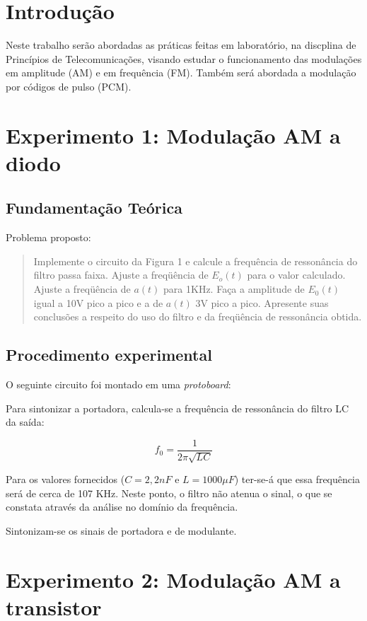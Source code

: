 \documentclass[]{report}
\title{}
\author{Renan Birck Pinheiro}
\begin{document}

\tableofcontents

\chapter{Introdução}
Neste trabalho serão abordadas as práticas feitas em laboratório, na discplina de Princípios de Telecomunicações, visando estudar o funcionamento das modulações em amplitude (AM) e em frequência (FM). Também será abordada a modulação por códigos de pulso (PCM). 

\chapter{Experimento 1: Modulação AM a diodo}
\section{Fundamentação Teórica}


Problema proposto:
\begin{quote}
Implemente o circuito da Figura 1 e calcule a frequência de ressonância do filtro passa faixa. Ajuste a freqüência de $E_o(t)$ para o valor calculado. Ajuste a freqüência de $a(t)$ para 1KHz. Faça a amplitude de $E_0(t)$ igual a 10V pico a pico e a de $a(t)$ 3V pico a pico. Apresente suas conclusões a respeito do uso do filtro e da freqüência de ressonância obtida.
\end{quote}

\section{Procedimento experimental}
O seguinte circuito foi montado em uma \textit{protoboard}:

Para sintonizar a portadora, calcula-se a frequência de ressonância do filtro LC da saída:

\begin{equation}
f_0 = \frac{1}{2 \pi \sqrt{LC}}
\end{equation}

Para os valores fornecidos ($C = 2,2 nF$ e $L = 1000 \mu F$) ter-se-á que essa frequência será de cerca de 107 KHz. Neste ponto, o filtro não atenua o sinal, o que se constata através da análise no domínio da frequência.

Sintonizam-se os sinais de portadora e de modulante.



\chapter{Experimento 2: Modulação AM a transistor}
\end{document}
